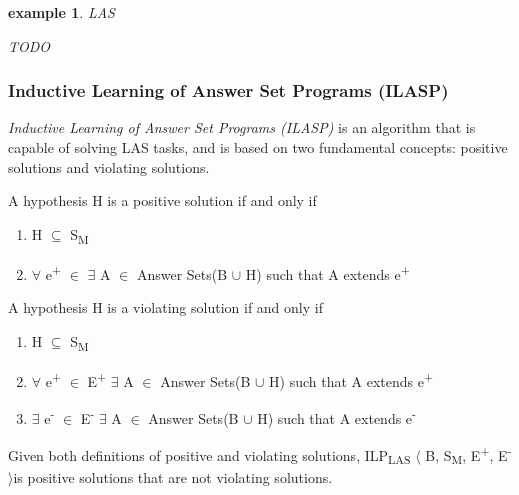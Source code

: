 \documentclass[12pt,twoside]{report}
\newtheorem{examp}{example}[section]
\begin{document}

\begin{examp} \normalfont LAS

TODO

\end{examp}
\label{las_example}


\subsubsection{Inductive Learning of Answer Set Programs (ILASP)}

\textit{Inductive Learning of Answer Set Programs (ILASP)} is an algorithm that is capable of solving LAS tasks, and is based on two fundamental concepts: positive solutions and violating solutions. 

A hypothesis H is a positive solution if and only if
\begin{enumerate}
\item H $\subseteq$ S\textsubscript{M}
\item $\forall$ e\textsuperscript{+} $\in$ $\exists$ A $\in$ Answer Sets(B $\cup$ H) such that A extends e\textsuperscript{+}
\end{enumerate}
A hypothesis H is a violating solution if and only if
\begin{enumerate}
\item H $\subseteq$ S\textsubscript{M}
\item $\forall$ e\textsuperscript{+} $\in$ E\textsuperscript{+} $\exists$ A $\in$ Answer Sets(B $\cup$ H) such that A extends e\textsuperscript{+}
\item $\exists$ e\textsuperscript{-} $\in$ E\textsuperscript{-} $\exists$ A $\in$ Answer Sets(B $\cup$ H) such that A extends e\textsuperscript{-}\\
\end{enumerate}

Given both definitions of positive and violating solutions, ILP\textsubscript{LAS} $\langle$ B, S\textsubscript{M}, E\textsuperscript{+}, E\textsuperscript{-} $\rangle$is positive solutions that are not violating solutions.
\end{document}
